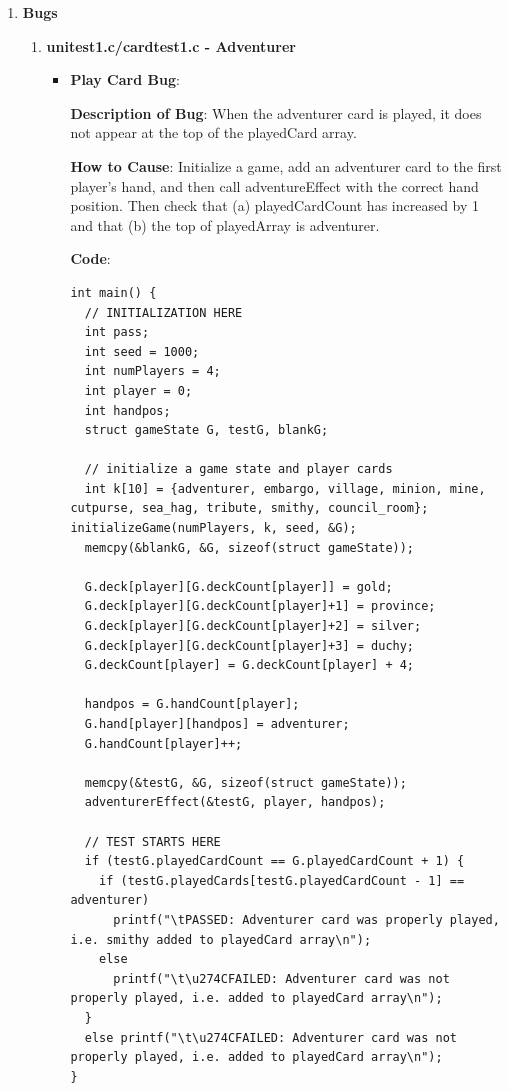 \documentclass[11pt,letterpaper]{article}
\begin{document}
\begin{enumerate}[label=\Roman*.]
  \item \textbf{Bugs}

    \begin{enumerate}
      \item \textbf{unitest1.c/cardtest1.c - Adventurer}
        
        \begin{itemize}[leftmargin=*]

        \item \textbf{Play Card Bug}:

        \textbf{Description of Bug}: When the adventurer card is played, it does
          not appear at the top of the playedCard array.

        \textbf{How to Cause}: Initialize a game, add an adventurer card to 
          the first player's hand, and then call adventureEffect with the correct
          hand position. Then check that (a) playedCardCount has increased by
          1 and that (b) the top of playedArray is adventurer.

        \textbf{Code}:
          \begin{lstlisting}
int main() {
  // INITIALIZATION HERE
  int pass;                             
  int seed = 1000;                      
  int numPlayers = 4;                   
  int player = 0;                       
  int handpos;                          
  struct gameState G, testG, blankG;    

  // initialize a game state and player cards
  int k[10] = {adventurer, embargo, village, minion, mine, cutpurse, sea_hag, tribute, smithy, council_room}; initializeGame(numPlayers, k, seed, &G);
  memcpy(&blankG, &G, sizeof(struct gameState));

  G.deck[player][G.deckCount[player]] = gold;         
  G.deck[player][G.deckCount[player]+1] = province;
  G.deck[player][G.deckCount[player]+2] = silver;
  G.deck[player][G.deckCount[player]+3] = duchy;
  G.deckCount[player] = G.deckCount[player] + 4;

  handpos = G.handCount[player];                     
  G.hand[player][handpos] = adventurer;     
  G.handCount[player]++;                                
  
  memcpy(&testG, &G, sizeof(struct gameState));         
  adventurerEffect(&testG, player, handpos);                     
  
  // TEST STARTS HERE
  if (testG.playedCardCount == G.playedCardCount + 1) {
    if (testG.playedCards[testG.playedCardCount - 1] == adventurer)
      printf("\tPASSED: Adventurer card was properly played, i.e. smithy added to playedCard array\n");
    else
      printf("\t\u274CFAILED: Adventurer card was not properly played, i.e. added to playedCard array\n");
  } 
  else printf("\t\u274CFAILED: Adventurer card was not properly played, i.e. added to playedCard array\n");
}
          \end{lstlisting}


\end{itemize}
\end{enumerate}
\end{enumerate}
\end{document}
